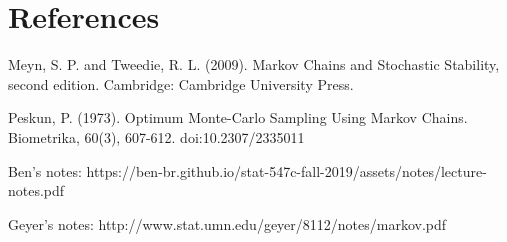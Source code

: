 \section{References}

\hspace{10pt} Meyn, S. P. and Tweedie, R. L. (2009). Markov Chains and Stochastic Stability, second edition. Cambridge: Cambridge University Press.

Peskun, P. (1973). Optimum Monte-Carlo Sampling Using Markov Chains. Biometrika, 60(3), 607-612. doi:10.2307/2335011

Ben's notes: https://ben-br.github.io/stat-547c-fall-2019/assets/notes/lecture-notes.pdf

Geyer's notes: http://www.stat.umn.edu/geyer/8112/notes/markov.pdf